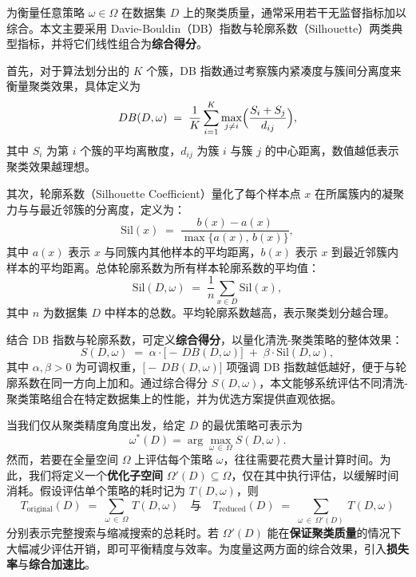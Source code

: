\documentclass[8pt]{article} %
\numberwithin{equation}{section}
\begin{document}
为衡量任意策略 \(\omega \in \Omega\) 在数据集 \(D\) 上的聚类质量，通常采用若干无监督指标加以综合。本文主要采用 Davie-Bouldin（DB）指数与轮廓系数（Silhouette）两类典型指标，并将它们线性组合为\textbf{综合得分}。

首先，对于算法划分出的 \(K\) 个簇，DB 指数通过考察簇内紧凑度与簇间分离度来衡量聚类效果，具体定义为
\begin{equation}\label{eq:db-score}
  DB(D,\omega)
  \;=\;
  \frac{1}{K}\sum_{i=1}^{K}
  \max_{j\neq i}
  \Bigl(\frac{S_i + S_j}{d_{ij}}\Bigr),
\end{equation}
其中 \(S_i\) 为第 \(i\) 个簇的平均离散度，\(d_{ij}\) 为簇 \(i\) 与簇 \(j\) 的中心距离，数值越低表示聚类效果越理想。

其次，轮廓系数（Silhouette Coefficient）量化了每个样本点 \(x\) 在所属簇内的凝聚力与与最近邻簇的分离度，定义为：
\begin{equation}\label{eq:silhouette}
  \mathrm{Sil}(x)
  \;=\;
  \frac{b(x) - a(x)}{\max\bigl\{a(x),\,b(x)\bigr\}},
\end{equation}
其中 \(a(x)\) 表示 \(x\) 与同簇内其他样本的平均距离，\(b(x)\) 表示 \(x\) 到最近邻簇内样本的平均距离。总体轮廓系数为所有样本轮廓系数的平均值：
\begin{equation}\label{eq:average-silhouette}
  \mathrm{Sil}(D,\omega)
  \;=\;
  \frac{1}{n} \sum_{x \in D} \mathrm{Sil}(x),
\end{equation}
其中 \(n\) 为数据集 \(D\) 中样本的总数。平均轮廓系数越高，表示聚类划分越合理。

结合 DB 指数与轮廓系数，可定义\textbf{综合得分}，以量化清洗-聚类策略的整体效果：
\begin{equation}\label{eq:S-score}
  S(D,\omega)
  \;=\;
  \alpha \cdot \bigl[-\,DB(D,\omega)\bigr]
  \;+\;
  \beta \cdot \mathrm{Sil}(D,\omega),
\end{equation}
其中 \(\alpha,\beta > 0\) 为可调权重，\(\bigl[-\,DB(D,\omega)\bigr]\) 项强调 DB 指数越低越好，便于与轮廓系数在同一方向上加和。通过综合得分 \(S(D,\omega)\)，本文能够系统评估不同清洗-聚类策略组合在特定数据集上的性能，并为优选方案提供直观依据。

当我们仅从聚类精度角度出发，给定 \(D\) 的最优策略可表示为
\begin{equation}\label{eq:best strategy}
  \omega^*(D)
  = \arg\max_{\omega \,\in\, \Omega} S(D,\omega).
\end{equation}
然而，若要在全量空间 \(\Omega\) 上评估每个策略 \(\omega\)，往往需要花费大量计算时间。为此，我们将定义一个\textbf{优化子空间} \(\Omega'(D)\subseteq \Omega\)，仅在其中执行评估，以缓解时间消耗。假设评估单个策略的耗时记为 \(T(D,\omega)\)，则
\begin{equation}\label{eq:T-original}
  T_{\text{original}}(D)
  \;=\;
  \sum_{\omega \,\in\, \Omega} \, T(D,\omega)
\quad\text{与}\quad
  T_{\text{reduced}}(D)
  \;=\;
  \sum_{\omega \,\in\, \Omega'(D)} \, T(D,\omega)
\end{equation}
分别表示完整搜索与缩减搜索的总耗时。若 \(\Omega'(D)\) 能在\textbf{保证聚类质量}的情况下大幅减少评估开销，即可平衡精度与效率。为度量这两方面的综合效果，引入\textbf{损失率}与\textbf{综合加速比}。
\end{document}
